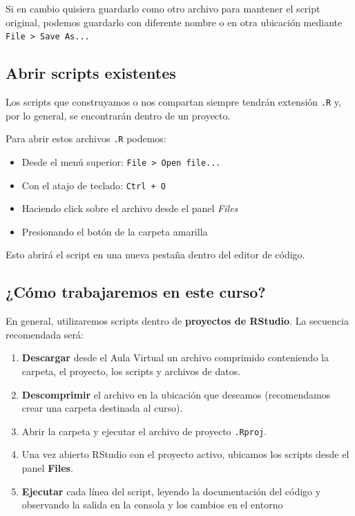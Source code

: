 \documentclass[
  spanish,
  letterpaper,
  DIV=11,
  numbers=noendperiod]{scrreprt}
\begin{document}
Si en cambio quisiera guardarlo como otro archivo para mantener el
script original, podemos guardarlo con diferente nombre o en otra
ubicación mediante \texttt{File\ \textgreater{}\ Save\ As...}

\subsection{Abrir scripts existentes}\label{abrir-scripts-existentes}

Los scripts que construyamos o nos compartan siempre tendrán extensión
\texttt{.R} y, por lo general, se encontrarán dentro de un proyecto.

Para abrir estos archivos \texttt{.R} podemos:

\begin{itemize}
\item
  Desde el menú superior: \texttt{File\ \textgreater{}\ Open\ file...}
\item
  Con el atajo de teclado: \texttt{Ctrl\ +\ O}
\item
  Haciendo click sobre el archivo desde el panel \emph{Files}
\item
  Presionando el botón de la carpeta amarilla 📂
\end{itemize}

Esto abrirá el script en una nueva pestaña dentro del editor de código.

\subsection{¿Cómo trabajaremos en este
curso?}\label{cuxf3mo-trabajaremos-en-este-curso}

En general, utilizaremos scripts dentro de \textbf{proyectos de
RStudio}. La secuencia recomendada será:

\begin{enumerate}
\def\labelenumi{\arabic{enumi}.}
\item
  \textbf{Descargar} desde el Aula Virtual un archivo comprimido
  conteniendo la carpeta, el proyecto, los scripts y archivos de datos.
\item
  \textbf{Descomprimir} el archivo en la ubicación que deseamos
  (recomendamos crear una carpeta destinada al curso).
\item
  Abrir la carpeta y ejecutar el archivo de proyecto \texttt{.Rproj}.
\item
  Una vez abierto RStudio con el proyecto activo, ubicamos los scripts
  desde el panel \textbf{Files}.
\item
  \textbf{Ejecutar} cada línea del script, leyendo la documentación del
  código y observando la salida en la consola y los cambios en el
  entorno
\end{enumerate}
\end{document}

